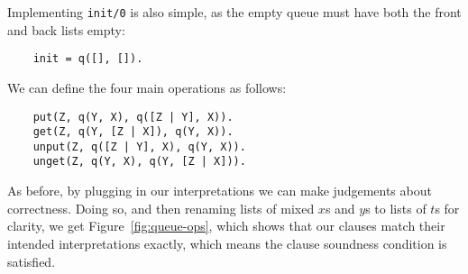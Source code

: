 Implementing \texttt{init/0} is also simple,
as the empty queue must have both the front and back lists empty:
\begin{verbatim}
    init = q([], []).
\end{verbatim}
We can define the four main operations as follows:
\begin{verbatim}
    put(Z, q(Y, X), q([Z | Y], X)).
    get(Z, q(Y, [Z | X]), q(Y, X)).
    unput(Z, q([Z | Y], X), q(Y, X)).
    unget(Z, q(Y, X), q(Y, [Z | X])).
\end{verbatim}
As before,
by plugging in our interpretations
we can make judgements about correctness.
Doing so,
and then renaming lists of mixed $x$s and $y$s to lists of $t$s for clarity,
we get Figure~\ref{fig:queue-ops},
which shows that our clauses match their intended interpretations exactly,
which means the clause soundness condition is satisfied.
